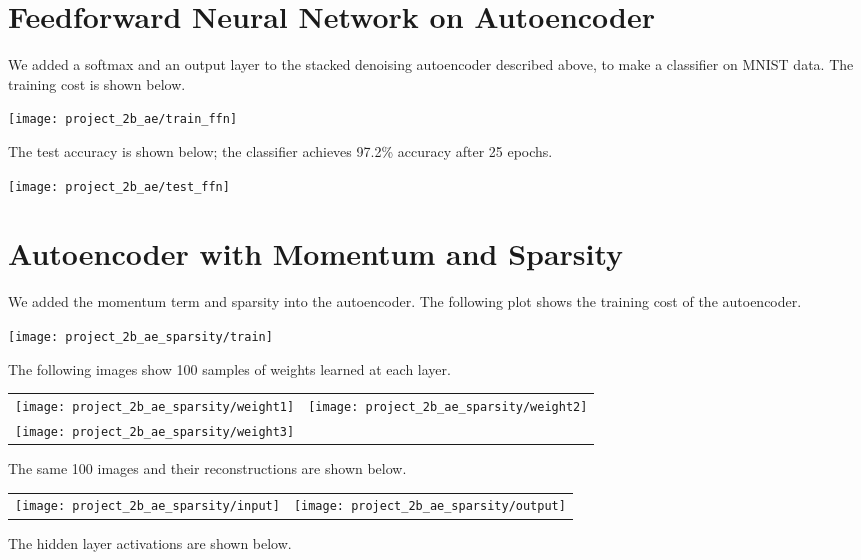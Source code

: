 \section*{Feedforward Neural Network on Autoencoder}

We added a softmax and an output layer to the stacked denoising autoencoder
described above, to make a classifier on MNIST data. The training cost is shown 
below.

\begin{center}
    \texttt{[image: project\_2b\_ae/train\_ffn]}
\end{center}

The test accuracy is shown below; the classifier achieves 97.2\% accuracy after
25 epochs.

\begin{center}
    \texttt{[image: project\_2b\_ae/test\_ffn]}
\end{center}

\section*{Autoencoder with Momentum and Sparsity}

We added the momentum term and sparsity into the autoencoder. The following plot
shows the training cost of the autoencoder.

\begin{center}
    \texttt{[image: project\_2b\_ae\_sparsity/train]}
\end{center}

The following images show 100 samples of weights learned at each layer.

\begin{longtabu}{X[c]X[c]}
    \texttt{[image: project\_2b\_ae\_sparsity/weight1]} &
    \texttt{[image: project\_2b\_ae\_sparsity/weight2]} \\
    \texttt{[image: project\_2b\_ae\_sparsity/weight3]}
\end{longtabu}

The same 100 images and their reconstructions are shown below.

\begin{longtabu}{X[c]X[c]}
    \texttt{[image: project\_2b\_ae\_sparsity/input]} &
    \texttt{[image: project\_2b\_ae\_sparsity/output]}
\end{longtabu}

The hidden layer activations are shown below.


